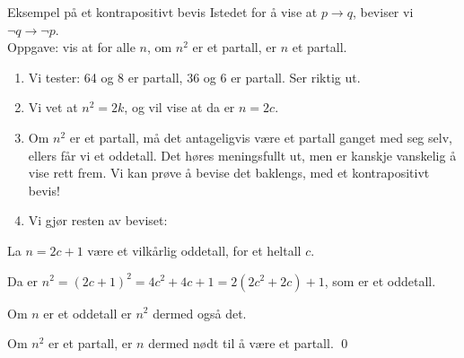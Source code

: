 \begin{frame}{Eksempel på et kontrapositivt bevis}
    Istedet for å vise at $p \rightarrow q$, beviser vi $\lnot q \rightarrow \lnot p$.\\[2mm]
    Oppgave: vis at for alle $n$, om $n^2$ er et partall, er $n$ et partall.
    \begin{enumerate}
        \pause
        \item Vi tester: 64 og 8 er partall, 36 og 6 er partall. Ser riktig ut.
        \pause
        \item Vi vet at $n^2 = 2k$, og vil vise at da er $n = 2c$.
        \pause
        \item Om $n^2$ er et partall, må det antageligvis være et partall ganget med seg selv, ellers får vi et oddetall. Det høres meningsfullt ut, men er kanskje vanskelig å vise rett frem. Vi kan prøve å bevise det baklengs, med et kontrapositivt bevis!
        \pause
        \item Vi gjør resten av beviset:
    \end{enumerate}

    \begin{block}{}
        La $n = 2c + 1$ være et vilkårlig oddetall, for et heltall $c$.

        \pause
        Da er $n^2 = (2c + 1)^2 = 4c^2 + 4c + 1 = 2(2c^2 + 2c) + 1$, som er et oddetall.

        \pause
        Om $n$ er et oddetall er $n^2$ dermed også det. 
        
        \pause
        Om $n^2$ er et partall, er $n$ dermed nødt til å være et partall. \qed
    \end{block}
\end{frame}


